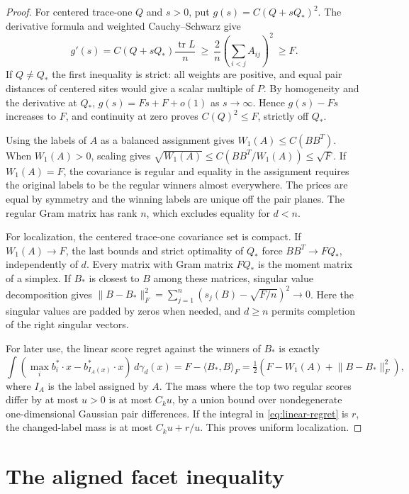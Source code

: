 \documentclass[11pt,reqno]{amsart}
\newcommand{\ip}[2]{\langle #1,#2\rangle}
\newcommand{\norm}[1]{\lVert #1\rVert}
\newcommand{\ga}{\gamma}
\DeclareMathOperator{\tr}{tr}
\begin{document}
\begin{proof}
For centered trace-one $Q$ and $s>0$, put $g(s)=C(Q+sQ_*)^2$.
The derivative formula and weighted Cauchy--Schwarz give
\[
 g'(s)=C(Q+sQ_*)\frac{\tr L}{n}
 \ \ge\ \frac{2}{n}\left(\sum_{i<j}A_{ij}\right)^2\ \ge F.
\]
If $Q\ne Q_*$ the first inequality is strict: all weights are positive,
and equal pair distances of centered sites would give a scalar multiple
of $P$. By homogeneity and the derivative at $Q_*$,
$g(s)=Fs+F+o(1)$ as $s\to\infty$. Hence $g(s)-Fs$ increases to $F$,
and continuity at zero proves $C(Q)^2\le F$, strictly off $Q_*$.

Using the labels of $A$ as a balanced assignment gives
$W_1(A)\le C(BB^T)$. When $W_1(A)>0$, scaling gives
$\sqrt{W_1(A)}\le C(BB^T/W_1(A))\le\sqrt F$.
If $W_1(A)=F$, the covariance is regular and equality in the assignment
requires the original labels to be the regular winners almost
everywhere. The prices are equal by symmetry and the winning labels
are unique off the pair planes. The regular Gram matrix has rank $n$,
which excludes equality for $d<n$.

For localization, the centered trace-one covariance set is compact.
If $W_1(A)\to F$, the last bounds and strict optimality of $Q_*$ force
$BB^T\to FQ_*$, independently of $d$. Every matrix with Gram matrix
$FQ_*$ is the moment matrix of a simplex. If $B_*$ is closest to $B$
among these matrices, singular value decomposition gives
$\norm{B-B_*}_F^2=\sum_{j=1}^{n}(s_j(B)-\sqrt{F/n})^2\to0$.
Here the singular values are padded by zeros when needed, and $d\ge n$
permits completion of the right singular vectors.

For later use, the linear score regret against the winners of $B_*$
is exactly
\begin{equation}\label{eq:linear-regret}
 \int(\max_i b_i^*\cdot x-b_{I_A(x)}^*\cdot x)\,d\ga_d(x)
    =F-\ip{B_*}{B}_F=\tfrac12(F-W_1(A)+\norm{B-B_*}_F^2),
\end{equation}
where $I_A$ is the label assigned by $A$. The mass where the top two
regular scores differ by at most $u>0$ is at most $C_k u$, by a union
bound over nondegenerate one-dimensional Gaussian pair differences.
If the integral in \eqref{eq:linear-regret} is $r$, the changed-label
mass is at most $C_k u+r/u$. This proves uniform localization.
\end{proof}

\section{The aligned facet inequality}\label{sec:interface}
\end{document}
